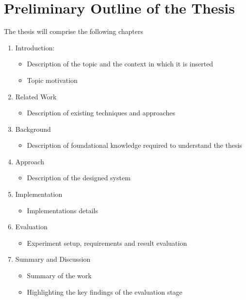 \chapter{Preliminary Outline of the Thesis}
\label{ch:outline}

The thesis will comprise the following chapters
\begin{enumerate}
	\item Introduction:
		\begin{itemize}
			\item Description of the topic and the context in which it is inserted
			\item Topic motivation
		\end{itemize}
	
	\item Related Work
	\begin{itemize}
		\item Description of existing techniques and approaches
	\end{itemize}
	
	\item Background
	\begin{itemize}
		\item Description of foundational knowledge required to understand the thesis
	\end{itemize}
	
	\item Approach
	\begin{itemize}
		\item Description of the designed system
	\end{itemize}
	
	\item Implementation
	\begin{itemize}
		\item Implementations details
	\end{itemize}
	
	\item Evaluation
	\begin{itemize}
		\item Experiment setup, requirements and result evaluation
	\end{itemize}
	
	\item Summary and Discussion
	\begin{itemize}
		\item Summary of the work
		\item Highlighting the key findings of the evaluation stage
	\end{itemize}
\end{enumerate}
